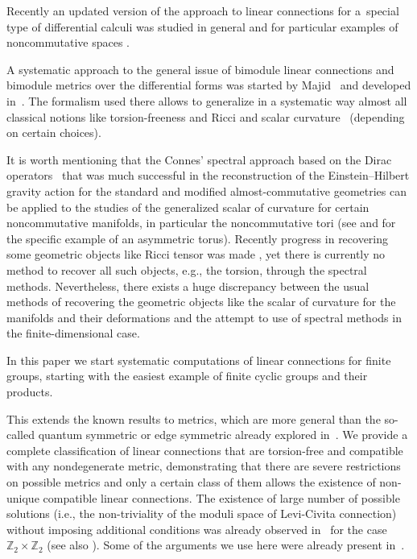 \documentclass[10pt,a4paper]{amsart}
\numberwithin{equation}{section}
\begin{document}
Recently an updated version of the approach to linear connections for a~special type of
differential calculi was studied in general and for particular examples of noncommutative
spaces \cite{BGJ, BGL, BGL2, BGM}.

A systematic approach to the general issue of bimodule linear connections and bimodule
metrics over the differential forms was started by Majid~\cite{BM11,majid2} and developed
in~\cite{BM14}. The formalism used there allows to generalize in a systematic way almost
all classical notions like torsion-freeness and Ricci and scalar curvature~\cite{BM_book}
(depending on certain choices).

It is worth mentioning that the Connes' spectral approach based on the Dirac operators~\cite{Connes:1994bk}
that was much successful in the reconstruction of the Einstein--Hilbert gravity action for the standard
and modified almost-commutative geometries \cite{CoMa:bk08} can be applied to the studies of the
generalized scalar of curvature for certain noncommutative manifolds, in particular the noncommutative
tori (see \cite{FK13,FK19} and \cite{DaSi15} for the specific example of an asymmetric torus).
 Recently progress in recovering some geometric objects like Ricci tensor was made
\cite{FGK19}, yet there is currently no method to recover all such objects, e.g.,
the torsion, through the spectral methods.
Nevertheless, there exists a huge discrepancy between the usual methods of recovering the
geometric objects like the scalar of curvature for the manifolds and their deformations and the
attempt to use of spectral methods \cite{Ba15,BG19,Gl17,PS} in the finite-dimensional case.

In this paper we start systematic computations of linear connections for finite groups, starting with the
easiest example of finite cyclic groups and their products.

This extends the known results to metrics, which are more general than the so-called quantum symmetric
or edge symmetric already explored in~\cite{majid2020,M13}. We provide a complete classification of linear
connections that are torsion-free and compatible with any nondegenerate metric, demonstrating that there are severe
restrictions on possible metrics and only a certain class of them allows the existence of non-unique compatible
linear connections. The existence of large number of possible solutions (i.e., the non-triviality of the moduli
space of Levi-Civita connection) without imposing additional conditions was already observed in~\cite{M1} for the
case $\mathbb{Z}_2\times\mathbb{Z}_2$ (see also \cite[Chapter~8.2]{BM_book}). Some of the arguments we use here
were already present in~\cite{M1,M2}.
\end{document}
